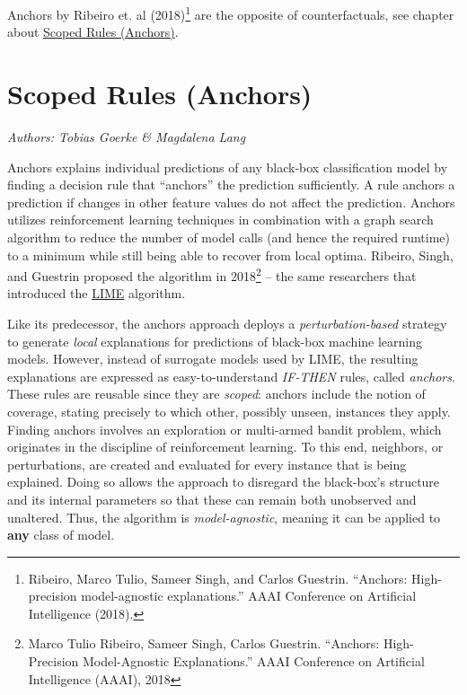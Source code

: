 \documentclass[
  12pt,
]{krantz}
\begin{document}
Anchors by Ribeiro et. al (2018)\footnote{Ribeiro, Marco Tulio, Sameer Singh, and Carlos Guestrin. ``Anchors: High-precision model-agnostic explanations.'' AAAI Conference on Artificial Intelligence (2018).} are the opposite of counterfactuals, see chapter about \protect\hyperlink{anchors}{Scoped Rules (Anchors)}.

\newpage

\hypertarget{anchors}{%
\section{Scoped Rules (Anchors)}\label{anchors}}

\emph{Authors: Tobias Goerke \& Magdalena Lang}

Anchors explains individual predictions of any black-box classification model by finding a decision rule that ``anchors'' the prediction sufficiently.
A rule anchors a prediction if changes in other feature values do not affect the prediction.
Anchors utilizes reinforcement learning techniques in combination with a graph search algorithm to reduce the number of model calls (and hence the required runtime) to a minimum while still being able to recover from local optima. Ribeiro, Singh, and Guestrin proposed the algorithm in 2018\footnote{Marco Tulio Ribeiro, Sameer Singh, Carlos Guestrin. ``Anchors: High-Precision Model-Agnostic Explanations.'' AAAI Conference on Artificial Intelligence (AAAI), 2018} -- the same researchers that introduced the \protect\hyperlink{lime}{LIME} algorithm.

Like its predecessor, the anchors approach deploys a \emph{perturbation-based} strategy to generate \emph{local} explanations for predictions of black-box machine learning models. However, instead of surrogate models used by LIME, the resulting explanations are expressed as easy-to-understand \emph{IF-THEN} rules, called \emph{anchors}. These rules are reusable since they are \emph{scoped}: anchors include the notion of coverage, stating precisely to which other, possibly unseen, instances they apply. Finding anchors involves an exploration or multi-armed bandit problem, which originates in the discipline of reinforcement learning. To this end, neighbors, or perturbations, are created and evaluated for every instance that is being explained. Doing so allows the approach to disregard the black-box's structure and its internal parameters so that these can remain both unobserved and unaltered. Thus, the algorithm is \emph{model-agnostic}, meaning it can be applied to \textbf{any} class of model.
\end{document}
